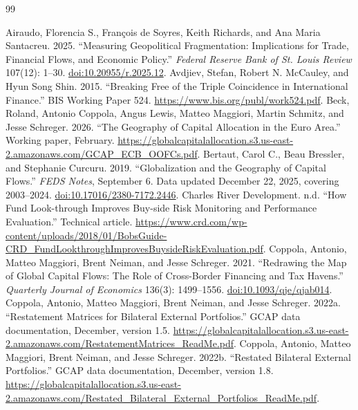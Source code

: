 \documentclass[11pt,a4paper]{article}
\begin{document}
\clearpage
\begin{thebibliography}{99}
\small\raggedright
{} Airaudo, Florencia S., Fran\c{c}ois de Soyres, Keith Richards, and Ana Maria Santacreu. 2025. ``Measuring Geopolitical Fragmentation: Implications for Trade, Financial Flows, and Economic Policy.'' \textit{Federal Reserve Bank of St. Louis Review} 107(12): 1--30. \href{https://doi.org/10.20955/r.2025.12}{doi:10.20955/r.2025.12}.
 Avdjiev, Stefan, Robert N. McCauley, and Hyun Song Shin. 2015. ``Breaking Free of the Triple Coincidence in International Finance.'' BIS Working Paper 524. \url{https://www.bis.org/publ/work524.pdf}.
 Beck, Roland, Antonio Coppola, Angus Lewis, Matteo Maggiori, Martin Schmitz, and Jesse Schreger. 2026. ``The Geography of Capital Allocation in the Euro Area.'' Working paper, February. \url{https://globalcapitalallocation.s3.us-east-2.amazonaws.com/GCAP_ECB_OOFCs.pdf}.
 Bertaut, Carol C., Beau Bressler, and Stephanie Curcuru. 2019. ``Globalization and the Geography of Capital Flows.'' \textit{FEDS Notes}, September 6. Data updated December 22, 2025, covering 2003--2024. \href{https://doi.org/10.17016/2380-7172.2446}{doi:10.17016/2380-7172.2446}.
 Charles River Development. n.d. ``How Fund Look-through Improves Buy-side Risk Monitoring and Performance Evaluation.'' Technical article. \url{https://www.crd.com/wp-content/uploads/2018/01/BobsGuide-CRD_FundLookthroughImprovesBuysideRiskEvaluation.pdf}.
 Coppola, Antonio, Matteo Maggiori, Brent Neiman, and Jesse Schreger. 2021. ``Redrawing the Map of Global Capital Flows: The Role of Cross-Border Financing and Tax Havens.'' \textit{Quarterly Journal of Economics} 136(3): 1499--1556. \href{https://doi.org/10.1093/qje/qjab014}{doi:10.1093/qje/qjab014}.
 Coppola, Antonio, Matteo Maggiori, Brent Neiman, and Jesse Schreger. 2022a. ``Restatement Matrices for Bilateral External Portfolios.'' GCAP data documentation, December, version 1.5. \url{https://globalcapitalallocation.s3.us-east-2.amazonaws.com/RestatementMatrices_ReadMe.pdf}.
 Coppola, Antonio, Matteo Maggiori, Brent Neiman, and Jesse Schreger. 2022b. ``Restated Bilateral External Portfolios.'' GCAP data documentation, December, version 1.8. \url{https://globalcapitalallocation.s3.us-east-2.amazonaws.com/Restated_Bilateral_External_Portfolios_ReadMe.pdf}.

\end{thebibliography}
\end{document}
